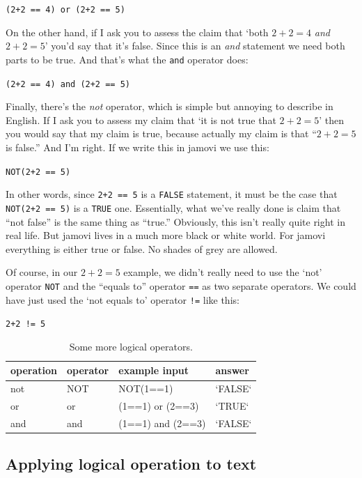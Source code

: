 \documentclass[
]{book}
\begin{document}
\texttt{(2+2\ ==\ 4)\ or\ (2+2\ ==\ 5)}

On the other hand, if I ask you to assess the claim that `both \(2+2 = 4\) \emph{and} \(2+2 = 5\)' you'd say that it's false. Since this is an \emph{and} statement we need both parts to be true. And that's what the \texttt{and} operator does:

\texttt{(2+2\ ==\ 4)\ and\ (2+2\ ==\ 5)}

Finally, there's the \emph{not} operator, which is simple but annoying to describe in English. If I ask you to assess my claim that `it is not true that \(2+2 = 5\)' then you would say that my claim is true, because actually my claim is that ``\(2+2 = 5\) is false.'' And I'm right. If we write this in jamovi we use this:

\texttt{NOT(2+2\ ==\ 5)}

In other words, since \texttt{2+2\ ==\ 5} is a \texttt{FALSE} statement, it must be the case that \texttt{NOT(2+2\ ==\ 5)} is a \texttt{TRUE} one. Essentially, what we've really done is claim that ``not false'' is the same thing as ``true.'' Obviously, this isn't really quite right in real life. But jamovi lives in a much more black or white world. For jamovi everything is either true or false. No shades of grey are allowed.

Of course, in our \(2+2 = 5\) example, we didn't really need to use the `not' operator \texttt{NOT} and the ``equals to'' operator \texttt{==} as two separate operators. We could have just used the `not equals to' operator \texttt{!=} like this:

\texttt{2+2\ !=\ 5}

\begin{table}

\caption{\label{tab:logicals2}Some more logical operators.}
\centering
\begin{tabular}[t]{llll}
\toprule
operation & operator & example input & answer\\
\midrule
not & NOT & NOT(1==1) & `FALSE`\\
or & or & (1==1) or (2==3) & `TRUE`\\
and & and & (1==1) and (2==3) & `FALSE`\\
\bottomrule
\end{tabular}
\end{table}

\hypertarget{logictext}{%
\subsection{Applying logical operation to text}\label{logictext}}
\end{document}
